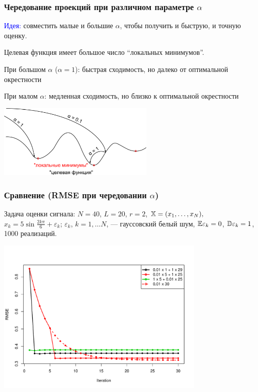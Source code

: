 \documentclass[unicode, notheorems]{beamer}
\begin{document}
\begin{frame}
	\frametitle{Чередование проекций при различном параметре $\alpha$}
	\vspace{-0.2cm}
	\textcolor{blue}{Идея:} совместить малые и большие $\alpha$, чтобы получить и быструю, и точную оценку.
	
	Целевая функция имеет большое число ``локальных минимумов''.
	
	\vspace{0.2cm} При большом $\alpha$ ($\alpha = 1$): быстрая сходимость, но далеко от оптимальной окрестности
	
	\vspace{0.2cm} При малом $\alpha$: медленная сходимость, но близко к оптимальной окрестности
    \begin{center}
		\includegraphics*[width = 7.5cm]{optim.pdf} 
    \end{center}
\end{frame}

\begin{frame}
	\frametitle{Сравнение (RMSE при чередовании $\alpha$)}
	Задача оценки сигнала: $N = 40$, $L = 20$, $r = 2$, $\mathbb{X} = (x_{1}, \ldots, x_N),$  $x_k = 5\sin{\frac{2 k \pi}{6}} + \varepsilon_k$; $\varepsilon_k$, $k = 1, \ldots N$, --- гауссовский белый шум, $\mathbb{E} \varepsilon_k = 0$, $\mathbb{D} \varepsilon_k = 1$, 1000 реализаций.
	
	\vspace{-1cm}
	\begin{center}
		\includegraphics*[width = 10cm]{various.pdf}
	\end{center}
\end{frame}
\end{document}
